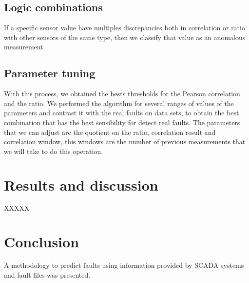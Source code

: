 \documentclass[journal]{IEEEtran}
\begin{document}
\subsection{Logic combinations}
If a specific sensor value have multiples discrepancies both in correlation or ratio with other sensors of the same type, then we classify that value as an anomalous measurement.

\subsection{Parameter tuning}
With this process, we obtained the bests thresholds for the Pearson correlation and the ratio. We performed the algorithm for several ranges of values of the parameters and contrast it with the real faults on data sets, to obtain the best combination that has the best sensibility for detect real faults. The parameters that we can adjust are the quotient on the ratio, correlation result and correlation window, this windows are the number of previous measurements that we will take to do this operation.
 



\section{Results and discussion}\label{sec:results}
XXXXX
\section{Conclusion}\label{sec:conclusion}
A methodology to predict  faults using information provided by SCADA systems and fault files was presented.



\end{document}
